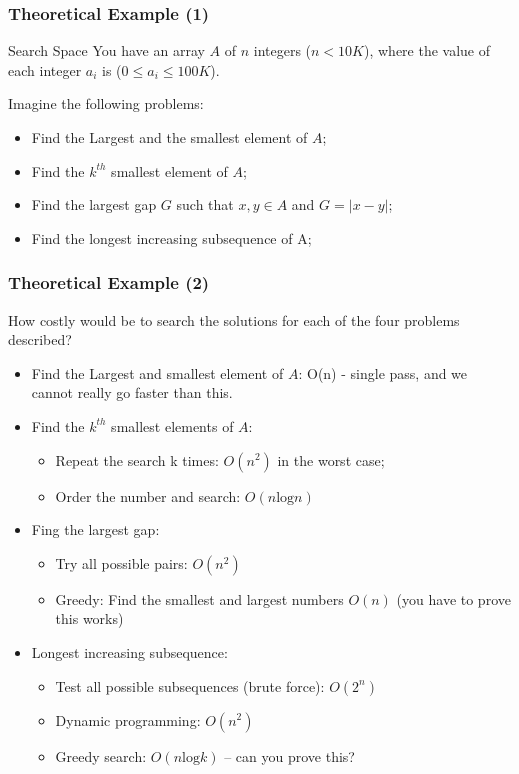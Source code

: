 \documentclass{beamer}
\begin{document}
\begin{frame}
  \frametitle{Theoretical Example (1)}

  \begin{block}{Search Space}
    You have an array $A$ of $n$ integers ($n < 10K$), where the value
    of each integer $a_i$ is ($0 \leq a_i \leq 100K$).
  \end{block}
  
  \bigskip

  Imagine the following problems:
  \begin{itemize}
  \item Find the Largest and the smallest element of $A$;
  \item Find the $k^{th}$ smallest element of $A$;
  \item Find the largest gap $G$ such that $x,y \in A$ and $G = |x-y|$;
  \item Find the longest increasing subsequence of A;
  \end{itemize}
\end{frame}

\begin{frame}
  \frametitle{Theoretical Example (2)} 

  {\smaller
  How costly would be to search the solutions for each of the four
  problems described?

  \bigskip
  
  \begin{itemize}
  \item Find the Largest and smallest element of $A$: O(n) - single
    pass, and we cannot really go faster than this.
  \item Find the $k^{th}$ smallest elements of $A$:
    \begin{itemize}
    \item Repeat the search k times: $O(n^2)$ in the worst case;
    \item Order the number and search: $O(n\text{log}n)$
    \end{itemize}
  \item Fing the largest gap:
    \begin{itemize}
    \item Try all possible pairs: $O(n^2)$
    \item Greedy: Find the smallest and largest numbers $O(n)$ (you
      have to prove this works)
    \end{itemize}
  \item Longest increasing subsequence:
    \begin{itemize}
    \item Test all possible subsequences (brute force): $O(2^n)$
    \item Dynamic programming: $O(n^2)$
    \item Greedy search: $O(n\text{log}k)$ -- can you prove this?
    \end{itemize}
  \end{itemize}  
  }
\end{frame}
\end{document}
